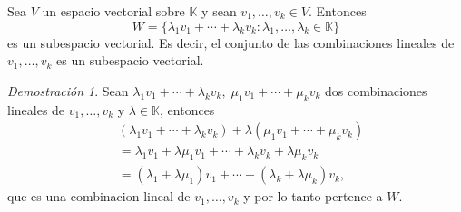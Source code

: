 \documentclass{article}
\theoremstyle{definition}
\theoremstyle{definition}
\theoremstyle{remark}
\newtheorem*{demo}{Demostración}
\begin{document}
\begin{teo}
  Sea $V$ un espacio vectorial sobre $\mathbb{K}$ y sean $v_1, \dots ,v_k \in V$. Entonces \[
    W=\{\lambda_1  v_1 + \cdots + \lambda_k v_k : \lambda_1, \dots ,\lambda_k \in \mathbb{K}\}
  \]
  es un subespacio vectorial. Es decir, el conjunto de las combinaciones lineales de $v_1, \dots ,v_k$ es un subespacio vectorial.
\end{teo}
\begin{demo} 
  Sean $\lambda_1 v_1 + \cdots + \lambda_k v_k, \; \mu_1 v_1 + \cdots + \mu_k v_k$ dos combinaciones lineales de $v_1, \dots ,v_k$ y $\lambda\in \mathbb{K}$, entonces 
  \[\begin{aligned}
&(\lambda_1 v_1 + \cdots + \lambda_k v_k) + \lambda(\mu_1 v_1 + \cdots + \mu_k v_k) \\ 
&= \lambda_1 v_1 + \lambda\mu_1 v_1 + \cdots + \lambda_k v_k + \lambda \mu_k v_k \\
&= (\lambda_1 + \lambda\mu_1 ) v_1 + \cdots + (\lambda_k+\lambda\mu_k)v_k,
\end{aligned}\]
que es una combinacion lineal de $v_1,\dots,v_k$ y por lo tanto pertence a $W$.
\end{demo} \pagebreak
\end{document}
